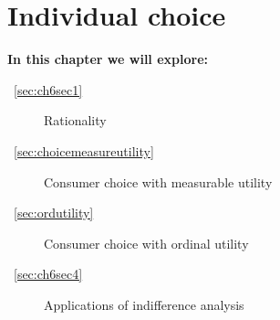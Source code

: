 \chapter{Individual choice} \label{chap:individualchoice}

\begin{topics}
\textbf{In this chapter we will explore:}
\begin{description}
\item [~\ref{sec:ch6sec1}] Rationality
\item [~\ref{sec:choicemeasureutility}] Consumer choice with measurable utility
\item [~\ref{sec:ordutility}] Consumer choice with ordinal utility
\item [~\ref{sec:ch6sec4}] Applications of indifference analysis
\end{description}
\end{topics}